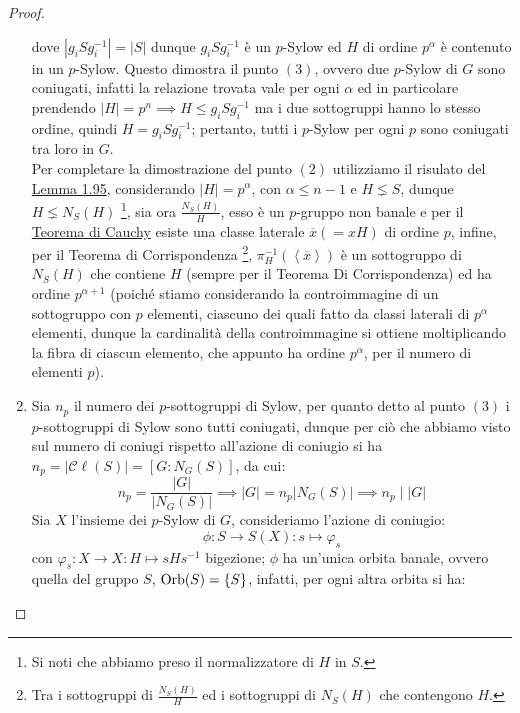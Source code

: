 \documentclass[11pt]{scrartcl}
\begin{document}
\begin{proof}
\begin{enumerate}[(1)]
\[                    \]
                dove $|g_iSg_i^{-1}| = |S|$ dunque $g_iSg_i^{-1}$ è un $p$-Sylow ed $H$ di ordine $p^{\alpha}$ è contenuto in un $p$-Sylow. Questo dimostra il punto $(3)$,
                ovvero due $p$-Sylow di $G$ sono coniugati, infatti la relazione trovata vale per ogni $\alpha$ ed in particolare prendendo $|H| = p^n \implies H \leqslant g_iSg_{i}^{-1}$ ma
                i due sottogruppi hanno lo stesso ordine, quindi $H = g_iSg_{i}^{-1}$; pertanto, tutti i $p$-Sylow per ogni $p$ sono coniugati tra loro in $G$. \\
                Per completare la dimostrazione del punto $(2)$ utilizziamo il risulato del \hyperref[l:1.95]{Lemma 1.95}, considerando $|H| = p^{\alpha}$, con $\alpha \leq n - 1$ e $H \lneq S$, dunque $H \lneq N_S(H)$ \footnote{Si noti che abbiamo preso il normalizzatore di $H$ in $S$.},
                sia ora $\frac{N_{S}(H)}{H}$, esso è un $p$-gruppo non banale e per il \hyperref[p:Cauchy]{Teorema di Cauchy} esiste una classe laterale $\overline x (= xH)$ di ordine $p$, infine, per il Teorema di Corrispondenza \footnote{Tra i sottogruppi di $\frac{N_{S}(H)}{H}$ ed i sottogruppi di $N_{S}(H)$ che contengono $H$.},
                $\pi^{-1}_H(\left<\overline x\right>)$ è un sottogruppo di $N_S(H)$ che contiene $H$ (sempre per il Teorema Di Corrispondenza) ed ha ordine $p^{\alpha+1}$ (poiché stiamo considerando la controimmagine di un sottogruppo con $p$ elementi,
                ciascuno dei quali fatto da classi laterali di $p^{\alpha}$ elementi, dunque la cardinalità della controimmagine si ottiene moltiplicando la fibra di ciascun elemento, che appunto ha ordine $p^{\alpha}$, per il numero di elementi $p$).
            \item Sia $n_p$ il numero dei $p$-sottogruppi di Sylow, per quanto detto al punto $(3)$ i $p$-sottogruppi di Sylow sono tutti coniugati,
            dunque per ciò che abbiamo visto sul numero di coniugi rispetto all'azione di coniugio si ha $n_p = |\mathcal{C}\ell(S)|=[G:N_G(S)]$, da cui:
                        \[ n_p = \frac{|G|}{|N_G(S)|} \implies |G| = n_p|N_G(S)| \implies n_p \mid |G|
                            \]
                Sia $X$ l'insieme dei $p$-Sylow di $G$, consideriamo l'azione di coniugio:
                    \[ \phi : S \longrightarrow S(X) : s \longmapsto \varphi_s
                        \]
                con $\varphi_s : X \longrightarrow X : H \longmapsto sHs^{-1}$ bigezione; $\phi$ ha un'unica orbita banale, ovvero quella del gruppo $S$, $\operatorname{Orb}(S) = \{S\}$, infatti, per ogni altra orbita si ha:

\end{enumerate}
\end{proof}
\end{document}
